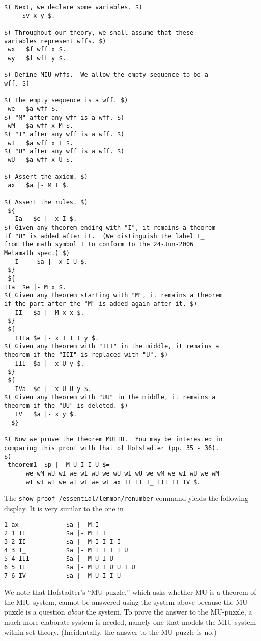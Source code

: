 \begin{verbatim}
$( Next, we declare some variables. $)
     $v x y $.

$( Throughout our theory, we shall assume that these
variables represent wffs. $)
 wx   $f wff x $.
 wy   $f wff y $.

$( Define MIU-wffs.  We allow the empty sequence to be a
wff. $)

$( The empty sequence is a wff. $)
 we   $a wff $.
$( "M" after any wff is a wff. $)
 wM   $a wff x M $.
$( "I" after any wff is a wff. $)
 wI   $a wff x I $.
$( "U" after any wff is a wff. $)
 wU   $a wff x U $.

$( Assert the axiom. $)
 ax   $a |- M I $.

$( Assert the rules. $)
 ${
   Ia   $e |- x I $.
$( Given any theorem ending with "I", it remains a theorem
if "U" is added after it.  (We distinguish the label I_
from the math symbol I to conform to the 24-Jun-2006
Metamath spec.) $)
   I_    $a |- x I U $.
 $}
 ${
IIa  $e |- M x $.
$( Given any theorem starting with "M", it remains a theorem
if the part after the "M" is added again after it. $)
   II   $a |- M x x $.
 $}
 ${
   IIIa $e |- x I I I y $.
$( Given any theorem with "III" in the middle, it remains a
theorem if the "III" is replaced with "U". $)
   III  $a |- x U y $.
 $}
 ${
   IVa  $e |- x U U y $.
$( Given any theorem with "UU" in the middle, it remains a
theorem if the "UU" is deleted. $)
   IV   $a |- x y $.
  $}

$( Now we prove the theorem MUIIU.  You may be interested in
comparing this proof with that of Hofstadter (pp. 35 - 36).
$)
 theorem1  $p |- M U I I U $=
      we wM wU wI we wI wU we wU wI wU we wM we wI wU we wM
      wI wI wI we wI wI we wI ax II II I_ III II IV $.
\end{verbatim}

The \texttt{show proof /essential/lemmon/renumber} command
yields the following display.  It is very similar
to the one in \cite[pp.~35--36]{Hofstadter}.

\begin{verbatim}
1 ax             $a |- M I
2 1 II           $a |- M I I
3 2 II           $a |- M I I I I
4 3 I_           $a |- M I I I I U
5 4 III          $a |- M U I U
6 5 II           $a |- M U I U U I U
7 6 IV           $a |- M U I I U
\end{verbatim}

We note that Hofstadter's ``MU-puzzle,'' which asks whether
MU is a theorem of the MIU-system, cannot be answered using
the system above because the MU-puzzle is a question {\em
about} the system.  To prove the answer to the MU-puzzle,
a much more elaborate system is needed, namely one that
models the MIU-system within set theory.  (Incidentally, the
answer to the MU-puzzle is no.)

